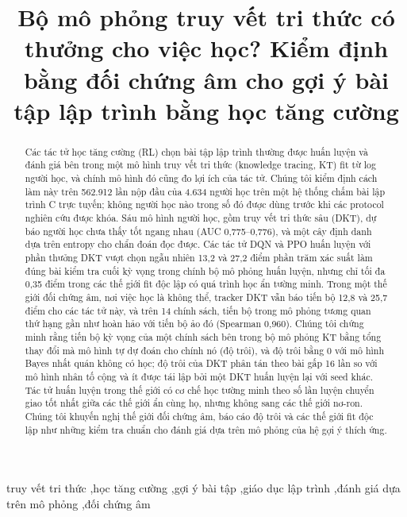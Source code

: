 \documentclass[a4paper,preprint,12pt,authoryear]{elsarticle}
\begin{document}
\begin{frontmatter}

\title{Bộ mô phỏng truy vết tri thức có thưởng cho việc học? Kiểm định bằng đối chứng âm cho gợi ý bài tập lập trình bằng học tăng cường}

\begin{abstract}
Các tác tử học tăng cường (RL) chọn bài tập lập trình thường được huấn luyện và đánh giá bên trong một mô hình truy vết tri thức (knowledge tracing, KT) fit từ log người học, và chính mô hình đó cũng đo lợi ích của tác tử. Chúng tôi kiểm định cách làm này trên 562.912 lần nộp đầu của 4.634 người học trên một hệ thống chấm bài lập trình C trực tuyến; không người học nào trong số đó được dùng trước khi các protocol nghiên cứu được khóa. Sáu mô hình người học, gồm truy vết tri thức sâu (DKT), dự báo người học chưa thấy tốt ngang nhau (AUC 0{,}775--0{,}776), và một cây định danh dựa trên entropy cho chẩn đoán đọc được. Các tác tử DQN và PPO huấn luyện với phần thưởng DKT vượt chọn ngẫu nhiên 13{,}2 và 27{,}2 điểm phần trăm xác suất làm đúng bài kiểm tra cuối kỳ vọng trong chính bộ mô phỏng huấn luyện, nhưng chỉ tối đa 0{,}35 điểm trong các thế giới fit độc lập có quá trình học ẩn tường minh. Trong một thế giới đối chứng âm, nơi việc học là không thể, tracker DKT vẫn báo tiến bộ 12{,}8 và 25{,}7 điểm cho các tác tử này, và trên 14 chính sách, tiến bộ trong mô phỏng tương quan thứ hạng gần như hoàn hảo với tiến bộ ảo đó (Spearman 0{,}960). Chúng tôi chứng minh rằng tiến bộ kỳ vọng của một chính sách bên trong bộ mô phỏng KT bằng tổng thay đổi mà mô hình tự dự đoán cho chính nó (độ trôi), và độ trôi bằng 0 với mô hình Bayes nhất quán không có học; độ trôi của DKT phân tán theo bài gấp 16 lần so với mô hình nhân tố cộng và ít được tái lập bởi một DKT huấn luyện lại với seed khác. Tác tử huấn luyện trong thế giới có cơ chế học tường minh theo số lần luyện chuyển giao tốt nhất giữa các thế giới ẩn cùng họ, nhưng không sang các thế giới nơ-ron. Chúng tôi khuyến nghị thế giới đối chứng âm, báo cáo độ trôi và các thế giới fit độc lập như những kiểm tra chuẩn cho đánh giá dựa trên mô phỏng của hệ gợi ý thích ứng.
\end{abstract}

\begin{keyword}
truy vết tri thức \sep học tăng cường \sep gợi ý bài tập \sep giáo dục lập trình \sep đánh giá dựa trên mô phỏng \sep đối chứng âm
\end{keyword}

\end{frontmatter}
\end{document}
